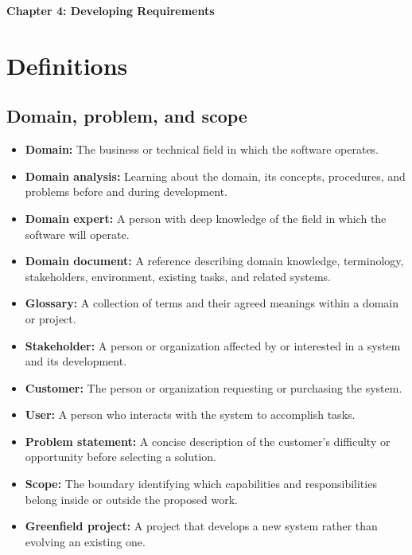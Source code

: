 \documentclass[11pt]{article}
\newcommand{\Title}[1]{%
  \begin{center}
    \fontsize{16}{28}\selectfont\textbf{#1}
  \end{center}
}
\newenvironment{DottedList}{%
  \begin{itemize}[leftmargin=2em, itemsep=0.35em, topsep=0.35em, label=\textbullet]
}{%
  \end{itemize}
}
\begin{document}
\Title{Chapter 4: Developing Requirements}
\section*{Definitions}
\subsection*{Domain, problem, and scope}
\begin{DottedList}
  \item \textbf{Domain:} The business or technical field in which the software operates.
  \item \textbf{Domain analysis:} Learning about the domain, its concepts, procedures, and problems before and during development.
  \item \textbf{Domain expert:} A person with deep knowledge of the field in which the software will operate.
  \item \textbf{Domain document:} A reference describing domain knowledge, terminology, stakeholders, environment, existing tasks, and related systems.
  \item \textbf{Glossary:} A collection of terms and their agreed meanings within a domain or project.
  \item \textbf{Stakeholder:} A person or organization affected by or interested in a system and its development.
  \item \textbf{Customer:} The person or organization requesting or purchasing the system.
  \item \textbf{User:} A person who interacts with the system to accomplish tasks.
  \item \textbf{Problem statement:} A concise description of the customer's difficulty or opportunity before selecting a solution.
  \item \textbf{Scope:} The boundary identifying which capabilities and responsibilities belong inside or outside the proposed work.
  \item \textbf{Greenfield project:} A project that develops a new system rather than evolving an existing one.
\end{DottedList}
\end{document}
